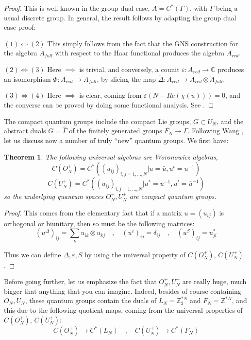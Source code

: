 \documentclass[12pt]{amsbook}
\newtheorem{theorem}{Theorem}[chapter]
\begin{document}
\begin{proof}
This is well-known in the group dual case, $A=C^*(\Gamma)$, with $\Gamma$ being a usual discrete group. In general, the result follows by adapting the group dual case proof:

\medskip

$(1)\iff(2)$ This simply follows from the fact that the GNS construction for the algebra $A_{full}$ with respect to the Haar functional produces the algebra $A_{red}$.

\medskip

$(2)\iff(3)$ Here $\implies$ is trivial, and conversely, a counit $\varepsilon:A_{red}\to\mathbb C$ produces an isomorphism $\Phi:A_{red}\to A_{full}$, by slicing the map $\widetilde{\Delta}:A_{red}\to A_{red}\otimes A_{full}$.

\medskip

$(3)\iff(4)$ Here $\implies$ is clear, coming from $\varepsilon(N-Re(\chi (u)))=0$, and the converse can be proved by doing some functional analysis. See \cite{wo1}.
\end{proof}

The compact quantum groups include the compact Lie groups, $G\subset U_N$, and the abstract duals $G=\widehat{\Gamma}$ of the finitely generated groups $F_N\to\Gamma$. Following Wang \cite{wan}, let us discuss now a number of truly ``new'' quantum groups. We first have:


\begin{theorem}
The following universal algebras are Woronowicz algebras,
$$C(O_N^+)=C^*\left((u_{ij})_{i,j=1,\ldots,N}\Big|u=\bar{u},u^t=u^{-1}\right)$$
$$C(U_N^+)=C^*\left((u_{ij})_{i,j=1,\ldots,N}\Big|u^*=u^{-1},u^t=\bar{u}^{-1}\right)$$
so the underlying quantum spaces $O_N^+,U_N^+$ are compact quantum groups.
\end{theorem}

\begin{proof}
This comes from the elementary fact that if a matrix $u=(u_{ij})$ is orthogonal or biunitary, then so must be the following matrices:
$$(u^\Delta)_{ij}=\sum_ku_{ik}\otimes u_{kj}\quad,\quad 
(u^\varepsilon)_{ij}=\delta_{ij}\quad,\quad 
(u^S)_{ij}=u_{ji}^*$$

Thus we can define $\Delta,\varepsilon,S$ by using the universal property of $C(O_N^+)$, $C(U_N^+)$.
\end{proof}

Before going further, let us emphasize the fact that $O_N^+,U_N^+$ are really huge, much bigger that anything that you can imagine. Indeed, besides of course containing $O_N,U_N$, these quantum groups contain the duals of $L_N=\mathbb Z_2^{*N}$ and $F_N=\mathbb Z^{*N}$, and this due to the following quotient maps, coming from the universal properties of $C(O_N^+)$, $C(U_N^+)$:
$$C(O_N^+)\to C^*(L_N)\quad,\quad C(U_N^+)\to C^*(F_N)$$
\end{document}
